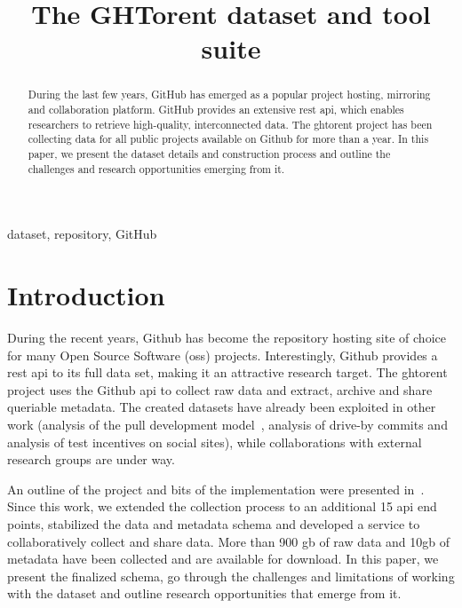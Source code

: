 \documentclass[conference]{IEEEtran}
\begin{document}
\title{The GHTorent dataset and tool suite}

\author{ 
}

\maketitle

\begin{abstract} 
  
  During the last few years, GitHub has emerged as a popular project hosting,
  mirroring and collaboration platform. GitHub provides an extensive {\sc rest
  api}, which enables researchers to retrieve high-quality, interconnected data.
  The {\sc ght}orent project has been collecting data for all public projects
  available on Github for more than a year. In this paper, we present the dataset
  details and construction process and outline the challenges and research
  opportunities emerging from it.

\end{abstract}

\begin{IEEEkeywords}
dataset, repository, GitHub
\end{IEEEkeywords}

\section{Introduction} During the recent years, Github has become the repository
hosting site of choice for many Open Source Software ({\sc oss}) projects.
Interestingly, Github provides a {\sc rest api} to its full data set, making it
an attractive research target. The {\sc ght}orent project uses the Github {\sc api}
to collect raw data and extract, archive and share queriable metadata. The
created datasets have already been exploited in other work (analysis of the pull
development model~\cite{GPD13}, analysis of drive-by commits and analysis of
test incentives on social sites),
while collaborations with external research groups are under way. 

An outline of the project and bits of the implementation were presented
in~\cite{GS12}. Since this work, we extended the collection process to an
additional 15 {\sc api} end points, stabilized the data and metadata schema and
developed a service to collaboratively collect and share data. More than 900{\sc
gb} of raw data and 10{\sc gb} of metadata have been collected and are available
for download. In this paper, we present the finalized schema, go through the
challenges and limitations of working with the dataset and outline research
opportunities that emerge from it.
\end{document}
